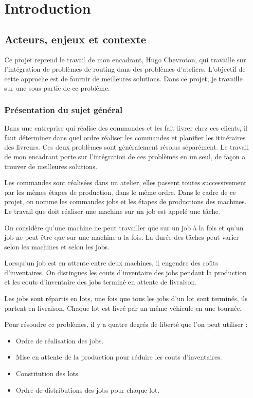 \chapter{Introduction}

\section{Acteurs, enjeux et contexte}
Ce projet reprend le travail de mon encadrant, Hugo Chevroton, 
    qui travaille sur l'intégration de problèmes de routing dans des problèmes d'ateliers.
    L'objectif de cette approche est de fournir de meilleures solutions.
Dans ce projet, je travaille sur une sous-partie de ce problème.

\subsection{Présentation du sujet général}
Dans une entreprise qui réalise des commandes et les fait livrer chez ces clients,
    il faut déterminer dans quel ordre réaliser les commandes et planifier les itinéraires des livreurs.
Ces deux problèmes sont généralement résolus séparément.
Le travail de mon encadrant porte sur l'intégration de ces problèmes en un seul,
     de façon a trouver de meilleures solutions.

Les commandes sont réalisées dans un atelier, 
    elles passent toutes successivement par les mêmes étapes de production, dans le même ordre.
Dans le cadre de ce projet, on nomme les commandes jobs et les étapes de productions des machines.
Le travail que doit réaliser une machine sur un job est appelé une tâche.

On considère qu'une machine ne peut travailler que sur un job à la fois 
    et qu'un job ne peut être que sur une machine a la fois.
La durée des tâches peut varier selon les machines et selon les jobs.

Lorsqu'un job est en attente entre deux machines, il engendre des coûts d'inventaires.
On distingues les couts d'inventaire des jobs pendant la production 
    et les couts d'inventaire des jobs terminé en attente de livraison.

Les jobs sont répartis en lots, une fois que tous les jobs d'un lot sont terminés, ils partent en livraison.
Chaque lot est livré par un même véhicule en une tournée.

Pour résoudre ce problèmes, il y a quatre degrés de liberté que l'on peut utiliser :
\begin{itemize}
    \item Ordre de réalisation des jobs.
    \item Mise en attente de la production pour réduire les couts d'inventaires.
    \item Constitution des lots.
    \item Ordre de distributions des jobs pour chaque lot.
\end{itemize}

